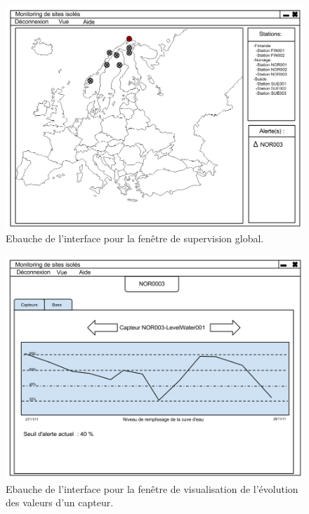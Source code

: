 \begin{figure}[hb]
  \centering
  \includegraphics[width=15cm]{Supervision/InterfaceSupervision1.png}
  \caption[Ebauche de l'interface pour la fenêtre de supervision global.]%
  {Ebauche de l'interface pour la fenêtre de supervision global.}
\end{figure}

\begin{figure}[hb]
  \centering
  \includegraphics[width=15cm]{Supervision/InterfaceSupervision2.png}
  \caption[Ebauche de l'interface pour la fenêtre de visualisation de l'évolution des valeurs d'un capteur.]%
  {Ebauche de l'interface pour la fenêtre de visualisation de l'évolution des valeurs d'un capteur.}
\end{figure}
 

